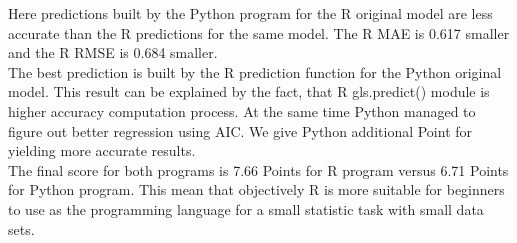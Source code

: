 \documentclass[
  twoside,
  12pt, a4paper,
  footinclude=true,
  headinclude=true,
  cleardoublepage=empty
]{article}
\begin{document}
Here predictions built by the Python program for the R original model are less accurate than the R predictions for the same model. The R MAE is 0.617 smaller and the R RMSE is 0.684 smaller.\\
The best prediction is built by the R prediction function for the Python original model. This result can be explained by the fact, that R gls.predict() module is higher accuracy computation process. At the same time Python managed to figure out better regression using AIC. We give Python additional Point for yielding more accurate results.\\
The final score for both programs is 7.66 Points for R program versus 6.71 Points for Python program. This mean that objectively R is more suitable for beginners to use as the programming language for a small statistic task with small data sets.
\end{document}
